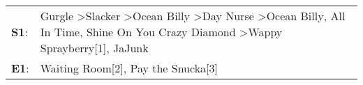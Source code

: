 \begin{supertabular}{p{0.03\textwidth}p{0.92\textwidth}}
 \textbf{S1}:  &  Gurgle\textsuperscript{} \textgreater \enspace Slacker\textsuperscript{} \textgreater \enspace Ocean Billy\textsuperscript{} \textgreater \enspace Day Nurse\textsuperscript{} \textgreater \enspace Ocean Billy\textsuperscript{}, \enspace All In Time\textsuperscript{}, \enspace Shine On You Crazy Diamond\textsuperscript{} \textgreater \enspace Wappy Sprayberry[1]\textsuperscript{}, \enspace JaJunk\textsuperscript{}  \enspace  \\
 \textbf{E1}:  &                                                                                                                                                                                                                                                                                                                                                   Waiting Room[2]\textsuperscript{}, \enspace Pay the Snucka[3]\textsuperscript{}  \enspace  \\
\end{supertabular}
